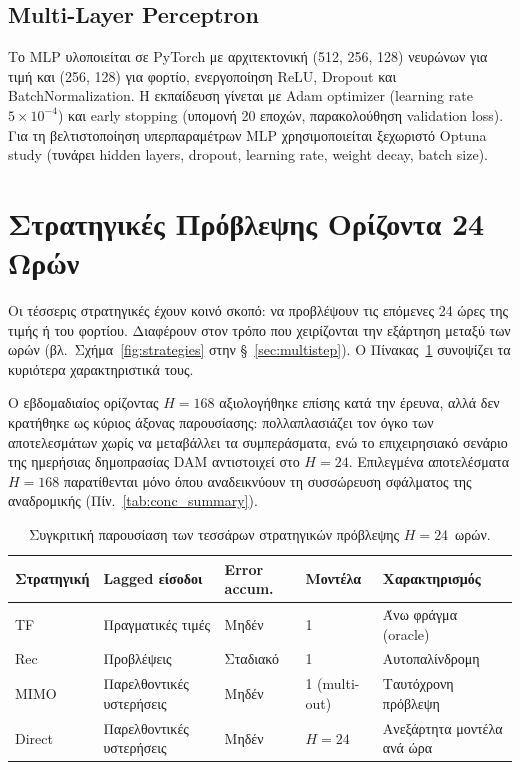 \subsection{Multi-Layer Perceptron}

Το MLP υλοποιείται σε PyTorch με αρχιτεκτονική (512, 256, 128) νευρώνων για τιμή και
(256, 128) για φορτίο, ενεργοποίηση ReLU, Dropout και BatchNormalization. Η εκπαίδευση
γίνεται με Adam optimizer (learning rate $5 \times 10^{-4}$) και early stopping (υπομονή
20 εποχών, παρακολούθηση validation loss). Για τη βελτιστοποίηση υπερπαραμέτρων MLP
χρησιμοποιείται ξεχωριστό Optuna study (τυνάρει hidden layers, dropout, learning rate,
weight decay, batch size).


\section{Στρατηγικές Πρόβλεψης Ορίζοντα 24 Ωρών}
\label{sec:strategies}

Οι τέσσερις στρατηγικές έχουν κοινό σκοπό: να προβλέψουν τις επόμενες 24 ώρες της
τιμής ή του φορτίου. Διαφέρουν στον τρόπο που χειρίζονται την εξάρτηση μεταξύ των ωρών
(βλ.\ Σχήμα~\ref{fig:strategies} στην §~\ref{sec:multistep}).
Ο Πίνακας~\ref{tab:strategies_summary} συνοψίζει τα κυριότερα χαρακτηριστικά τους.

Ο εβδομαδιαίος ορίζοντας $H=168$ αξιολογήθηκε επίσης κατά την έρευνα, αλλά δεν κρατήθηκε ως
κύριος άξονας παρουσίασης: πολλαπλασιάζει τον όγκο των αποτελεσμάτων χωρίς να μεταβάλλει τα
συμπεράσματα, ενώ το επιχειρησιακό σενάριο της ημερήσιας δημοπρασίας DAM αντιστοιχεί στο
$H=24$. Επιλεγμένα αποτελέσματα $H=168$ παρατίθενται μόνο όπου αναδεικνύουν τη συσσώρευση
σφάλματος της αναδρομικής (Πίν.~\ref{tab:conc_summary}).

\begin{table}[H]
\centering
\footnotesize
\caption{Συγκριτική παρουσίαση των τεσσάρων στρατηγικών πρόβλεψης $H=24$~ωρών.}
\label{tab:strategies_summary}
\begin{tabular}{lllll}
\toprule
Στρατηγική & Lagged είσοδοι & Error accum. & Μοντέλα & Χαρακτηρισμός \\
\midrule
TF        & Πραγματικές τιμές & Μηδέν       & 1           & Άνω φράγμα (oracle) \\
Rec       & Προβλέψεις        & Σταδιακό    & 1           & Αυτοπαλίνδρομη \\
MIMO      & Παρελθοντικές υστερήσεις & Μηδέν & 1 (multi-out) & Ταυτόχρονη πρόβλεψη \\
Direct    & Παρελθοντικές υστερήσεις & Μηδέν & $H=24$      & Ανεξάρτητα μοντέλα ανά ώρα \\
\bottomrule
\end{tabular}
\end{table}

